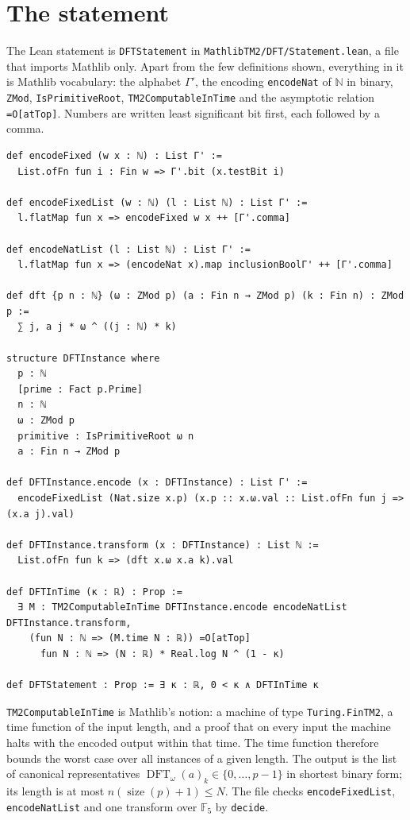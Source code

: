 \documentclass[11pt]{amsart}
\newcommand{\F}{\mathbb{F}}
\newcommand{\N}{\mathbb{N}}
\newcommand{\size}{\operatorname{size}}
\newcommand{\DFT}{\operatorname{DFT}}
\newcommand{\lean}[1]{\texttt{#1}}
\begin{document}
\section{The statement}
\label{sec:statement}

The Lean statement is \lean{DFTStatement} in \lean{MathlibTM2/DFT/Statement.lean}, a file that
imports Mathlib only. Apart from the few definitions shown, everything in it is Mathlib
vocabulary: the alphabet $\Gamma'$, the encoding \lean{encodeNat} of $\N$ in binary,
\lean{ZMod}, \lean{IsPrimitiveRoot}, \lean{TM2ComputableInTime} and the asymptotic relation
\lean{=O[atTop]}. Numbers are written least significant bit first, each followed by a comma.

\noindent\begin{minipage}{\linewidth}
\begin{lstlisting}
def encodeFixed (w x : ℕ) : List Γ' :=
  List.ofFn fun i : Fin w => Γ'.bit (x.testBit i)

def encodeFixedList (w : ℕ) (l : List ℕ) : List Γ' :=
  l.flatMap fun x => encodeFixed w x ++ [Γ'.comma]

def encodeNatList (l : List ℕ) : List Γ' :=
  l.flatMap fun x => (encodeNat x).map inclusionBoolΓ' ++ [Γ'.comma]

def dft {p n : ℕ} (ω : ZMod p) (a : Fin n → ZMod p) (k : Fin n) : ZMod p :=
  ∑ j, a j * ω ^ ((j : ℕ) * k)

structure DFTInstance where
  p : ℕ
  [prime : Fact p.Prime]
  n : ℕ
  ω : ZMod p
  primitive : IsPrimitiveRoot ω n
  a : Fin n → ZMod p

def DFTInstance.encode (x : DFTInstance) : List Γ' :=
  encodeFixedList (Nat.size x.p) (x.p :: x.ω.val :: List.ofFn fun j => (x.a j).val)

def DFTInstance.transform (x : DFTInstance) : List ℕ :=
  List.ofFn fun k => (dft x.ω x.a k).val

def DFTInTime (κ : ℝ) : Prop :=
  ∃ M : TM2ComputableInTime DFTInstance.encode encodeNatList DFTInstance.transform,
    (fun N : ℕ => (M.time N : ℝ)) =O[atTop]
      fun N : ℕ => (N : ℝ) * Real.log N ^ (1 - κ)

def DFTStatement : Prop := ∃ κ : ℝ, 0 < κ ∧ DFTInTime κ
\end{lstlisting}
\end{minipage}

\lean{TM2ComputableInTime} is Mathlib's notion: a machine of type \lean{Turing.FinTM2}, a
time function of the input length, and a proof that on every input the machine halts with the
encoded output within that time. The time function therefore bounds the worst case over all
instances of a given length. The output is the list of canonical representatives
$\DFT_\omega(a)_k \in \{0, \dots, p-1\}$ in shortest binary form; its length is at most
$n (\size(p) + 1) \le N$. The file checks \lean{encodeFixedList}, \lean{encodeNatList} and one
transform over $\F_5$ by \lean{decide}.
\end{document}
